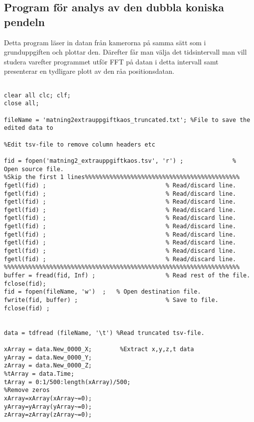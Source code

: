 









\subsection{Program för analys av den dubbla koniska pendeln}

Detta program läser in datan från kamerorna på samma sätt som i grunduppgiften och plottar den. Därefter får man välja det tidsintervall man vill studera varefter programmet utför FFT på datan i detta intervall samt presenterar en tydligare plott av den råa positionsdatan. 

\begin{lstlisting}[style=Matlab-editor]

clear all clc; clf; 
close all;

fileName = 'matning2extrauppgiftkaos_truncated.txt'; %File to save the edited data to

%Edit tsv-file to remove column headers etc

fid = fopen('matning2_extrauppgiftkaos.tsv', 'r') ;              % Open source file.
%Skip the first 1 lines%%%%%%%%%%%%%%%%%%%%%%%%%%%%%%%%%%%%%%%%%%%% 
fgetl(fid) ;                                  % Read/discard line.
fgetl(fid) ;                                  % Read/discard line.
fgetl(fid) ;                                  % Read/discard line.
fgetl(fid) ;                                  % Read/discard line.
fgetl(fid) ;                                  % Read/discard line.
fgetl(fid) ;                                  % Read/discard line.
fgetl(fid) ;                                  % Read/discard line.
fgetl(fid) ;                                  % Read/discard line.
fgetl(fid) ;                                  % Read/discard line.
fgetl(fid) ;                                  % Read/discard line.
%%%%%%%%%%%%%%%%%%%%%%%%%%%%%%%%%%%%%%%%%%%%%%%%%%%%%%%%%%%%%%%%%%% 
buffer = fread(fid, Inf) ;                    % Read rest of the file.
fclose(fid);
fid = fopen(fileName, 'w')  ;   % Open destination file.
fwrite(fid, buffer) ;                         % Save to file.
fclose(fid) ;


data = tdfread (fileName, '\t') %Read truncated tsv-file.

xArray = data.New_0000_X;        %Extract x,y,z,t data
yArray = data.New_0000_Y;
zArray = data.New_0000_Z;
%tArray = data.Time;
tArray = 0:1/500:length(xArray)/500;
%Remove zeros
xArray=xArray(xArray~=0);
yArray=yArray(yArray~=0);
zArray=zArray(zArray~=0);


\end{lstlisting}
